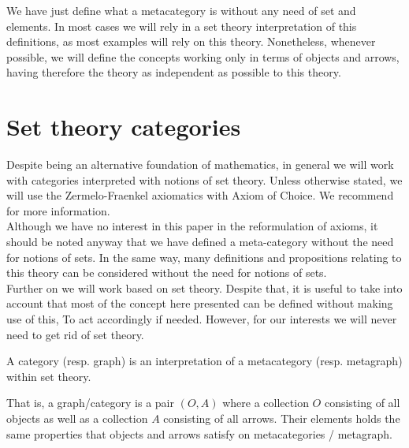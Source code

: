 We have just define what a  metacategory is without any need of set and elements. In most cases we will rely in a set theory interpretation of this definitions, as most examples will rely on this theory. Nonetheless, whenever possible, we will define the concepts working only in terms of objects and arrows, having therefore the theory as independent as possible to this theory.\\






\section{Set theory categories}
Despite being an alternative foundation of mathematics, in general we will work with categories interpreted with notions of set theory. Unless otherwise stated, we will use the Zermelo-Fraenkel axiomatics with Axiom of Choice. We recommend \cite{kunen2014set} for more information.\\

Although we have no interest in this paper in the reformulation of axioms, it should be noted anyway that we have defined a meta-category without the need for notions of sets. In the same way, many definitions and propositions relating to this theory can be considered without the need for notions of sets.\\


Further on we will work based on set theory. Despite that, it is useful to take into account that most of the concept here presented can be defined without making use of this, To act accordingly if needed. However, for our interests we will never need to get rid of set theory.

\begin{definition}
  A category (resp. graph) is an interpretation of a metacategory (resp. metagraph) within set theory.
\end{definition}


That is, a graph/category is a pair $(O,A)$ where a collection $O$ consisting of all objects as well as a collection $A$ consisting of all arrows. Their elements holds the same properties that objects and arrows satisfy on metacategories / metagraph.\\



